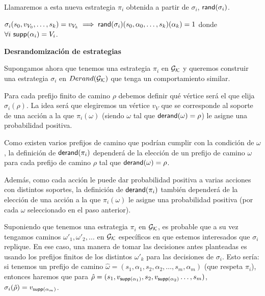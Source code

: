 Llamaremos a esta nueva estrategia $\pi_i$ obtenida a partir de $\sigma_i$,
$\textsf{rand}(\sigma_i)$.

\begin{center}
	$\sigma_i(s_0, v_{V_0}, \dots, s_k) = v_{V_k} \implies \textsf{rand}(\sigma_i)(s_0, \alpha_0, \dots, s_k)(\alpha_k) = 1$ donde \\ $\forall i \ \textsf{supp}(\alpha_i) = V_i$.
\end{center}

\textbf{Desrandomización de estrategias}

Supongamos ahora que tenemos una estrategia $\pi_i$ en $\mathcal{G}_{\mathcal{K}}$ y queremos
construir una estrategia $\sigma_i$ en $Derand(\mathcal{G}_{\mathcal{K}})$ que tenga un comportamiento
similar.

Para cada prefijo finito de camino $\rho$ debemos definir qué vértice será el
que elija $\sigma_i(\rho)$. La idea será que elegiremos un vértice $v_V$ que se
corresponde al soporte de una acción a la que $\pi_i(\omega)$ (siendo $\omega$
tal que $\textsf{derand}(\omega) = \rho$) le asigne una probabilidad positiva.

Como existen varios prefijos de camino que podrían cumplir con la condición de
$\omega$, la definición de $\textsf{derand}(\pi_i)$ dependerá de la elección de un
prefijo de camino $\omega$ para cada prefijo de camino $\rho$ tal que
$\textsf{derand}(\omega) = \rho$.

Además, como cada acción le puede dar probabilidad positiva a varias acciones
con distintos soportes, la definición de $\textsf{derand}(\pi_i)$ también dependerá de
la elección de una acción a la que $\pi_i(\omega)$ le asigne una probabilidad
positiva (por cada $\omega$ seleccionado en el paso anterior).

\begin{boxgris}{}
	Suponiendo que tenemos una estrategia $\pi_i$ en $\mathcal{G}_{\mathcal{K}}$, es probable que a su vez tengamos caminos $\omega'_1, \omega'_2, \dots$ en $\mathcal{G}_{\mathcal{K}}$ específicos en que estemos interesados que $\sigma_i$ replique. En ese caso, una manera de tomar las decisiones antes planteadas es usando los prefijos finitos de los distintos $\omega'_k$ para las decisiones de $\sigma_i$. Esto sería: si tenemos un prefijo de camino $\hat \omega = (s_1, \alpha_1, s_2, \alpha_2, \dots, s_m, \alpha_m)$ (que respeta $\pi_i$), entonces haremos que para $\hat \rho = (s_1, v_{\textsf{supp}(\alpha_1)}, s_2, v_{\textsf{supp}(\alpha_2)} \dots, s_m)$, $\sigma_i(\hat \rho) = v_{\textsf{supp}(\alpha_m)}$.
\end{boxgris}

